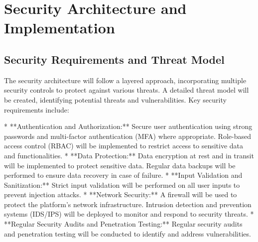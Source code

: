 \documentclass[11pt,a4paper,oneside]{article}
\begin{document}
\section{Security Architecture and Implementation}

\subsection{Security Requirements and Threat Model}

The security architecture will follow a layered approach, incorporating multiple security controls to protect against various threats.  A detailed threat model will be created, identifying potential threats and vulnerabilities.  Key security requirements include:

* **Authentication and Authorization:**  Secure user authentication using strong passwords and multi-factor authentication (MFA) where appropriate.  Role-based access control (RBAC) will be implemented to restrict access to sensitive data and functionalities.
* **Data Protection:** Data encryption at rest and in transit will be implemented to protect sensitive data.  Regular data backups will be performed to ensure data recovery in case of failure.
* **Input Validation and Sanitization:**  Strict input validation will be performed on all user inputs to prevent injection attacks.
* **Network Security:**  A firewall will be used to protect the platform's network infrastructure.  Intrusion detection and prevention systems (IDS/IPS) will be deployed to monitor and respond to security threats.
* **Regular Security Audits and Penetration Testing:**  Regular security audits and penetration testing will be conducted to identify and address vulnerabilities.
\end{document}
